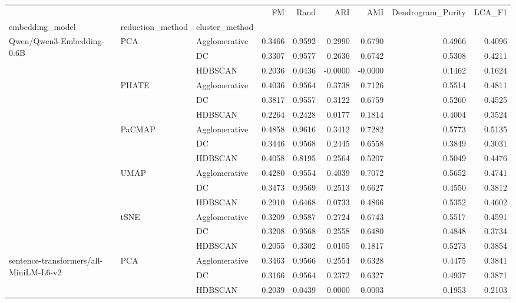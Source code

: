 \begin{tabular}{lllrrrrrr}
\toprule
 &  &  & FM & Rand & ARI & AMI & Dendrogram_Purity & LCA_F1 \\
embedding_model & reduction_method & cluster_method &  &  &  &  &  &  \\
\midrule
\multirow[t]{15}{*}{Qwen/Qwen3-Embedding-0.6B} & \multirow[t]{3}{*}{PCA} & Agglomerative & 0.3466 & 0.9592 & 0.2990 & 0.6790 & 0.4966 & 0.4096 \\
 &  & DC & 0.3307 & 0.9577 & 0.2636 & 0.6742 & 0.5308 & 0.4211 \\
 &  & HDBSCAN & 0.2036 & 0.0436 & -0.0000 & -0.0000 & 0.1462 & 0.1624 \\
\cline{2-9}
 & \multirow[t]{3}{*}{PHATE} & Agglomerative & 0.4036 & 0.9564 & 0.3738 & 0.7126 & 0.5514 & 0.4811 \\
 &  & DC & 0.3817 & 0.9557 & 0.3122 & 0.6759 & 0.5260 & 0.4525 \\
 &  & HDBSCAN & 0.2264 & 0.2428 & 0.0177 & 0.1814 & 0.4004 & 0.3524 \\
\cline{2-9}
 & \multirow[t]{3}{*}{PaCMAP} & Agglomerative & 0.4858 & 0.9616 & 0.3412 & 0.7282 & 0.5773 & 0.5135 \\
 &  & DC & 0.3446 & 0.9568 & 0.2445 & 0.6558 & 0.3849 & 0.3031 \\
 &  & HDBSCAN & 0.4058 & 0.8195 & 0.2564 & 0.5207 & 0.5049 & 0.4476 \\
\cline{2-9}
 & \multirow[t]{3}{*}{UMAP} & Agglomerative & 0.4280 & 0.9554 & 0.4039 & 0.7072 & 0.5652 & 0.4741 \\
 &  & DC & 0.3473 & 0.9569 & 0.2513 & 0.6627 & 0.4550 & 0.3812 \\
 &  & HDBSCAN & 0.2910 & 0.6468 & 0.0733 & 0.4866 & 0.5352 & 0.4602 \\
\cline{2-9}
 & \multirow[t]{3}{*}{tSNE} & Agglomerative & 0.3209 & 0.9587 & 0.2724 & 0.6743 & 0.5517 & 0.4591 \\
 &  & DC & 0.3208 & 0.9568 & 0.2558 & 0.6480 & 0.4848 & 0.3734 \\
 &  & HDBSCAN & 0.2055 & 0.3302 & 0.0105 & 0.1817 & 0.5273 & 0.3854 \\
\cline{1-9} \cline{2-9}
\multirow[t]{15}{*}{sentence-transformers/all-MiniLM-L6-v2} & \multirow[t]{3}{*}{PCA} & Agglomerative & 0.3463 & 0.9566 & 0.2554 & 0.6328 & 0.4475 & 0.3841 \\
 &  & DC & 0.3166 & 0.9564 & 0.2372 & 0.6327 & 0.4937 & 0.3871 \\
 &  & HDBSCAN & 0.2039 & 0.0439 & 0.0000 & 0.0003 & 0.1953 & 0.2103 \\

\end{tabular}

